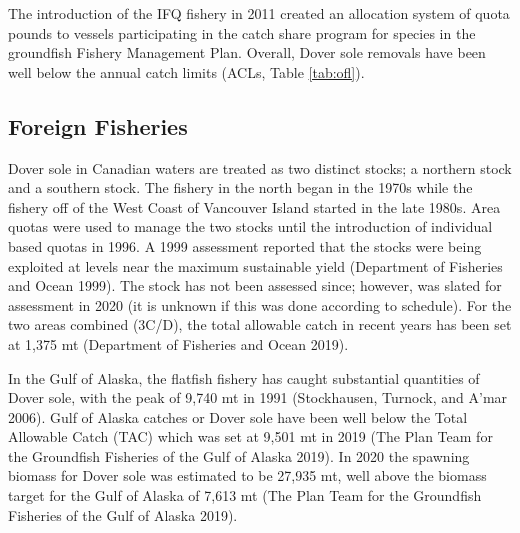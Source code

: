 \documentclass[11pt,
  english,
  a4paper,
]{article}
\begin{document}
\leavevmode\tagmcend\tagstructend\par


The introduction of the IFQ fishery in 2011 created an allocation system of quota pounds to vessels participating in the catch share program for species in the groundfish Fishery Management Plan. Overall, Dover sole removals have been well below the annual catch limits (ACLs, Table \ref{tab:ofl}).

\leavevmode\tagmcend\tagstructend\par


\hypertarget{foreign-fisheries}{%
\subsection{Foreign Fisheries}\label{foreign-fisheries}}

\leavevmode\tagmcend\tagstructend


Dover sole in Canadian waters are treated as two distinct stocks; a northern stock and a southern stock. The fishery in the north began in the 1970s while the fishery off of the West Coast of Vancouver Island started in the late 1980s. Area quotas were used to manage the two stocks until the introduction of individual based quotas in 1996. A 1999 assessment reported that the stocks were being exploited at levels near the maximum sustainable yield {(Department of Fisheries and Ocean 1999)\leavevmode\tagmcend\tagstructend}. The stock has not been assessed since; however, was slated for assessment in 2020 (it is unknown if this was done according to schedule). For the two areas combined (3C/D), the total allowable catch in recent years has been set at 1,375 mt {(Department of Fisheries and Ocean 2019)\leavevmode\tagmcend\tagstructend}.

\leavevmode\tagmcend\tagstructend\par


In the Gulf of Alaska, the flatfish fishery has caught substantial quantities of Dover sole, with the peak of 9,740 mt in 1991 {(Stockhausen, Turnock, and A'mar 2006)\leavevmode\tagmcend\tagstructend}. Gulf of Alaska catches or Dover sole have been well below the Total Allowable Catch (TAC) which was set at 9,501 mt in 2019 {(The Plan Team for the Groundfish Fisheries of the Gulf of Alaska 2019)\leavevmode\tagmcend\tagstructend}. In 2020 the spawning biomass for Dover sole was estimated to be 27,935 mt, well above the biomass target for the Gulf of Alaska of 7,613 mt {(The Plan Team for the Groundfish Fisheries of the Gulf of Alaska 2019)\leavevmode\tagmcend\tagstructend}.
\end{document}
